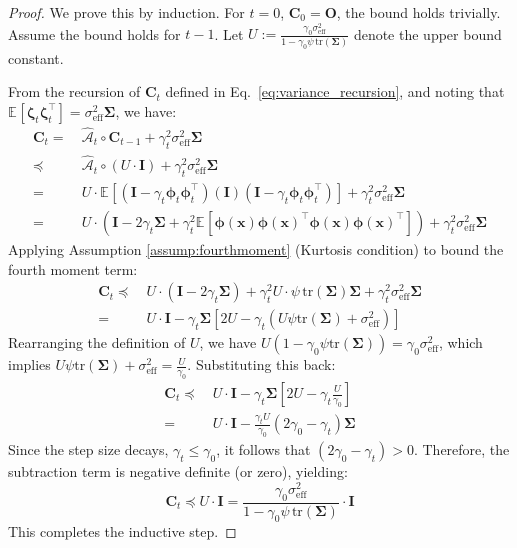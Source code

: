 \documentclass{article}
\theoremstyle{definition}
\theoremstyle{definition}
\theoremstyle{plain}
\theoremstyle{plain}
\theoremstyle{plain}
\theoremstyle{plain}
\theoremstyle{plain}
\newcommand{\bs}[1]{\boldsymbol{\mathbf{#1}}}
\newcommand{\mc}[1]{{\mathcal{#1}}}
\newcommand{\tr}{\mathrm{tr}}
\newcommand{\vecx}{\mathbf{x}}
\newcommand{\eff}{\mathrm{eff}}
\newcommand{\id}{\mathbf{I}}
\newcommand{\ex}[2][]{\mathbb{E}_{#1}\left[ #2 \right]}
\begin{document}
\begin{proof}
    We prove this by induction. For $t=0$, $\bs C_0 = \bs O$, the bound holds trivially.
    Assume the bound holds for $t-1$. Let $U := \frac{\gamma_0\sigma_\eff^2}{1-\gamma_0 \psi\,\tr(\bs \Sigma)}$ denote the upper bound constant.
    
    From the recursion of $\bs C_t$ defined in Eq.~\eqref{eq:variance_recursion}, and noting that $\ex{\bs\zeta_t\bs\zeta_t^\top} = \sigma_\eff^2 \bs\Sigma$, we have:
    \begin{equation}
        \begin{aligned}
            \bs C_t =&\ \mc{\widehat A}_t\circ\bs C_{t-1}+\gamma_t^2 \sigma_\eff^2 \bs\Sigma\\
            \preceq&\ \mc{\widehat A}_t\circ (U \cdot \id) +\gamma_t^2 \sigma_\eff^2 \bs\Sigma\\
            =&\ U \cdot \ex{(\id - \gamma_t \bs\phi_t\bs\phi_t^\top)(\id)(\id - \gamma_t \bs\phi_t\bs\phi_t^\top)} + \gamma_t^2\sigma_\eff^2\bs\Sigma\\
            =&\ U \cdot (\id-2\gamma_t\bs\Sigma + \gamma_t^2 \ex{\bs\phi(\vecx)\bs\phi(\vecx)^\top\bs\phi(\vecx)\bs\phi(\vecx)^\top}) +\gamma_t^2\sigma_\eff^2\bs\Sigma
        \end{aligned}
    \end{equation}
    Applying Assumption \ref{assump:fourthmoment} (Kurtosis condition) to bound the fourth moment term:
    \begin{equation}
        \begin{aligned}
            \bs C_t \preceq&\ U \cdot (\id-2\gamma_t\bs\Sigma) + \gamma_t^2 U \cdot \psi\,\tr(\bs\Sigma)\bs\Sigma+\gamma_t^2\sigma_\eff^2\bs\Sigma\\
            =&\ U \cdot \id - \gamma_t \bs\Sigma \left[ 2U - \gamma_t (U \psi \tr(\bs\Sigma) + \sigma_\eff^2) \right]
        \end{aligned}
    \end{equation}
    Rearranging the definition of $U$, we have $U(1-\gamma_0\psi\tr(\bs\Sigma)) = \gamma_0\sigma_\eff^2$, which implies $U \psi\tr(\bs\Sigma) + \sigma_\eff^2 = \frac{U}{\gamma_0}$. Substituting this back:
    \begin{equation}
        \begin{aligned}
            \bs C_t \preceq&\ U \cdot \id - \gamma_t \bs\Sigma \left[ 2U - \gamma_t \frac{U}{\gamma_0} \right]\\
            =&\ U \cdot \id - \frac{\gamma_t U}{\gamma_0} (2\gamma_0 - \gamma_t) \bs\Sigma
        \end{aligned}
    \end{equation}
    Since the step size decays, $\gamma_t \le \gamma_0$, it follows that $(2\gamma_0 - \gamma_t) > 0$. Therefore, the subtraction term is negative definite (or zero), yielding:
    \begin{equation}
        \bs C_t \preceq U \cdot \id = \frac{\gamma_0\sigma_\eff^2}{1-\gamma_0 \psi\,\tr(\bs \Sigma)}\cdot \id
    \end{equation}
    This completes the inductive step.
\end{proof}
\end{document}

